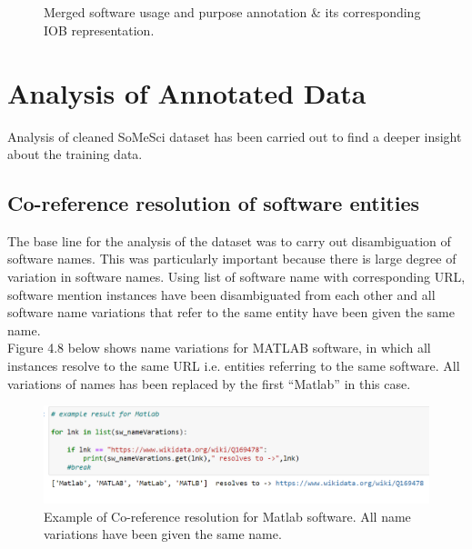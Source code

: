 \begin{figure}[h]
	
	\myfloatalign
	
	 \\
	\\
	\caption{Merged software usage and purpose annotation \& its corresponding IOB representation.}
\end{figure}




\section{Analysis of Annotated Data}
\label{sec:dataset:Analysis}

Analysis of cleaned SoMeSci dataset has been carried out to find a deeper insight about the training data. 

\subsection{Co-reference resolution of software entities }
\label{subsec:dataset:Analysis:resolution}

The base line for the analysis of the dataset was to carry out disambiguation of software names. This was particularly important because there is large degree of variation in software names. Using list of software name with corresponding URL, software mention instances have been disambiguated from each other and all software name variations that refer to the same entity have been given the same name. \\

Figure 4.8 below shows name variations for MATLAB software, in which all instances resolve to the same URL i.e. entities referring to the same software. All variations of names has been replaced by the first “Matlab” in this case.

\begin{figure}[htbp]
	\centering
	\includegraphics[width=1\textwidth]{4.graphics/figures/ch_4/pdf/Corefresolution}
	\caption{Example of Co-reference resolution for Matlab software. All name variations have been given the same name.}
	\label{fig:chapter04:setup}
\end{figure}


